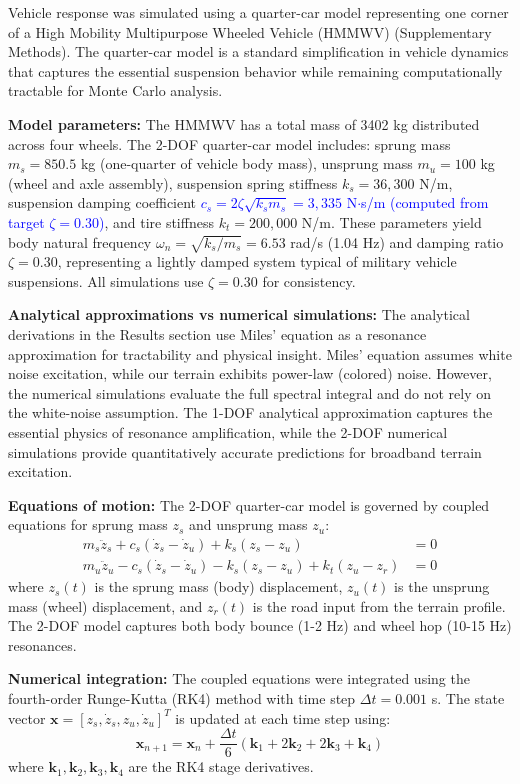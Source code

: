 \documentclass[11pt]{article}
\begin{document}
Vehicle response was simulated using a quarter-car model representing one corner of a High Mobility Multipurpose Wheeled Vehicle (HMMWV) (Supplementary Methods). The quarter-car model is a standard simplification in vehicle dynamics that captures the essential suspension behavior while remaining computationally tractable for Monte Carlo analysis.

\textbf{Model parameters:} The HMMWV has a total mass of 3402 kg distributed across four wheels. The 2-DOF quarter-car model includes: sprung mass $m_s = 850.5$ kg (one-quarter of vehicle body mass), unsprung mass $m_u = 100$ kg (wheel and axle assembly), suspension spring stiffness $k_s = 36,300$ N/m, suspension damping coefficient \textcolor{blue}{$c_s = 2\zeta\sqrt{k_s m_s} = 3,335$ N$\cdot$s/m (computed from target $\zeta = 0.30$)}, and tire stiffness $k_t = 200,000$ N/m. These parameters yield body natural frequency $\omega_n = \sqrt{k_s/m_s} = 6.53$ rad/s (1.04 Hz) and damping ratio $\zeta = 0.30$, representing a lightly damped system typical of military vehicle suspensions. All simulations use $\zeta = 0.30$ for consistency.


\textbf{Analytical approximations vs numerical simulations:} The analytical derivations in the Results section use Miles' equation as a resonance approximation for tractability and physical insight. Miles' equation assumes white noise excitation, while our terrain exhibits power-law (colored) noise. However, the numerical simulations evaluate the full spectral integral and do not rely on the white-noise assumption. The 1-DOF analytical approximation captures the essential physics of resonance amplification, while the 2-DOF numerical simulations provide quantitatively accurate predictions for broadband terrain excitation.

\textbf{Equations of motion:} The 2-DOF quarter-car model is governed by coupled equations for sprung mass $z_s$ and unsprung mass $z_u$:
\begin{align}
m_s \ddot{z}_s + c_s (\dot{z}_s - \dot{z}_u) + k_s (z_s - z_u) &= 0 \\
m_u \ddot{z}_u - c_s (\dot{z}_s - \dot{z}_u) - k_s (z_s - z_u) + k_t (z_u - z_r) &= 0
\end{align}
where $z_s(t)$ is the sprung mass (body) displacement, $z_u(t)$ is the unsprung mass (wheel) displacement, and $z_r(t)$ is the road input from the terrain profile. The 2-DOF model captures both body bounce (1-2 Hz) and wheel hop (10-15 Hz) resonances.

\textbf{Numerical integration:} The coupled equations were integrated using the fourth-order Runge-Kutta (RK4) method with time step $\Delta t = 0.001$ s. The state vector $\mathbf{x} = [z_s, \dot{z}_s, z_u, \dot{z}_u]^T$ is updated at each time step using:
\begin{equation}
\mathbf{x}_{n+1} = \mathbf{x}_n + \frac{\Delta t}{6}(\mathbf{k}_1 + 2\mathbf{k}_2 + 2\mathbf{k}_3 + \mathbf{k}_4)
\end{equation}
where $\mathbf{k}_1, \mathbf{k}_2, \mathbf{k}_3, \mathbf{k}_4$ are the RK4 stage derivatives.
\end{document}
